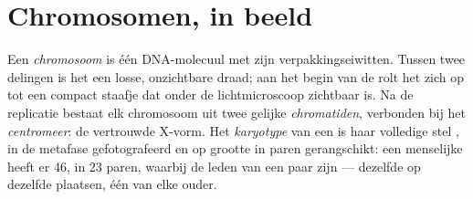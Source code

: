 \section{Chromosomen, in beeld}

\begin{definition}\label{def:g11:cell-cycle-mitosis:chromosome}
Een \emph{chromosoom} is één DNA-molecuul met zijn verpakkingseiwitten.
Tussen twee delingen is het een losse, onzichtbare draad; aan het begin
van de  rolt het zich op tot een compact staafje dat onder de
lichtmicroscoop zichtbaar is. Na de replicatie bestaat elk chromosoom uit
twee gelijke \emph{chromatiden}, verbonden bij het
\emph{centromeer}: de vertrouwde X-vorm. Het
\emph{karyotype} van een  is haar volledige stel
, in de metafase gefotografeerd en op grootte in paren
gerangschikt: een menselijke  heeft er 46, in 23 paren, waarbij de
leden van een paar \emph{} zijn --- dezelfde  op dezelfde
plaatsen, één van elke ouder.
\end{definition}

